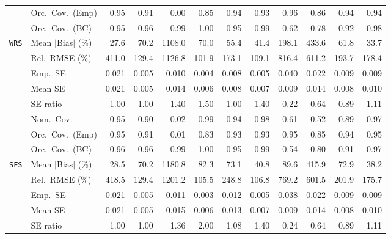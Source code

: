 \begin{landscape}
\begin{longtable}{llrrrrrrrrrr}
 & Orc.\ Cov.\ (Emp) & \cellcolor{rankone}0.95 & 0.91 & 0.00 & 0.85 & \cellcolor{ranktwo}0.94 & 0.93 & \cellcolor{rankthree}0.96 & 0.86 & 0.94 & 0.94 \\
 & Orc.\ Cov.\ (BC) & \cellcolor{ranktwo}0.95 & \cellcolor{rankthree}0.96 & 0.99 & 1.00 & \cellcolor{rankone}0.95 & 0.99 & 0.62 & 0.78 & 0.92 & 0.98 \\
\addlinespace[2pt]
\quad \texttt{WRS} & Mean $|$Bias$|$ (\%) & \cellcolor{rankone}27.6 & 70.2 & 1108.0 & 70.0 & 55.4 & \cellcolor{rankthree}41.4 & 198.1 & 433.6 & 61.8 & \cellcolor{ranktwo}33.7 \\
 & Rel.\ RMSE (\%) & 411.0 & \cellcolor{rankthree}129.4 & 1126.8 & \cellcolor{rankone}101.9 & 173.1 & \cellcolor{ranktwo}109.1 & 816.4 & 611.2 & 193.7 & 178.4 \\
 & Emp.\ SE & 0.021 & 0.005 & 0.010 & 0.004 & 0.008 & 0.005 & 0.040 & 0.022 & 0.009 & 0.009 \\
 & Mean SE & 0.021 & 0.005 & 0.014 & 0.006 & 0.008 & 0.007 & 0.009 & 0.014 & 0.008 & 0.010 \\
 & SE ratio & \cellcolor{rankone}1.00 & \cellcolor{ranktwo}1.00 & 1.40 & 1.50 & \cellcolor{rankthree}1.00 & 1.40 & 0.22 & 0.64 & 0.89 & 1.11 \\
 & Nom.\ Cov. & \cellcolor{rankone}0.95 & 0.90 & 0.02 & 0.99 & \cellcolor{ranktwo}0.94 & 0.98 & 0.61 & 0.52 & 0.89 & \cellcolor{rankthree}0.97 \\
 & Orc.\ Cov.\ (Emp) & \cellcolor{rankthree}0.95 & 0.91 & 0.01 & 0.83 & 0.93 & 0.93 & \cellcolor{rankone}0.95 & 0.85 & 0.94 & \cellcolor{ranktwo}0.95 \\
 & Orc.\ Cov.\ (BC) & \cellcolor{rankthree}0.96 & \cellcolor{ranktwo}0.96 & 0.99 & 1.00 & \cellcolor{rankone}0.95 & 0.99 & 0.54 & 0.80 & 0.91 & 0.97 \\
\addlinespace[2pt]
\quad \texttt{SFS} & Mean $|$Bias$|$ (\%) & \cellcolor{rankone}28.5 & 70.2 & 1180.8 & 82.3 & 73.1 & \cellcolor{rankthree}40.8 & 89.6 & 415.9 & 72.9 & \cellcolor{ranktwo}38.2 \\
 & Rel.\ RMSE (\%) & 418.5 & \cellcolor{rankthree}129.4 & 1201.2 & \cellcolor{rankone}105.5 & 248.8 & \cellcolor{ranktwo}106.8 & 769.2 & 601.5 & 201.9 & 175.7 \\
 & Emp.\ SE & 0.021 & 0.005 & 0.011 & 0.003 & 0.012 & 0.005 & 0.038 & 0.022 & 0.009 & 0.009 \\
 & Mean SE & 0.021 & 0.005 & 0.015 & 0.006 & 0.013 & 0.007 & 0.009 & 0.014 & 0.008 & 0.010 \\
 & SE ratio & \cellcolor{rankone}1.00 & \cellcolor{ranktwo}1.00 & 1.36 & 2.00 & \cellcolor{rankthree}1.08 & 1.40 & 0.24 & 0.64 & 0.89 & 1.11 \\

\end{longtable}
\end{landscape}
